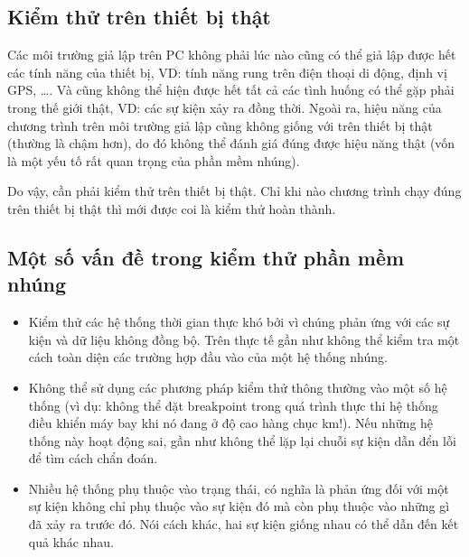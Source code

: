         \subsection{Kiểm thử trên thiết bị thật}
            Các môi trường giả lập trên PC không phải lúc nào cũng có thể giả lập được
            hết các tính năng của thiết bị, VD: tính năng rung trên điện thoại
            di động, định vị GPS, \ldots. Và cũng không thể hiện được hết tất
            cả các tình huống có thể gặp phải trong thế giới thật, VD: các sự
            kiện xảy ra đồng thời. Ngoài ra, hiệu năng của chương trình trên
            môi trường giả lập cũng không giống với trên thiết bị thật (thường
            là chậm hơn), do đó không thể đánh giá đúng được hiệu năng thật
            (vốn là một yếu tố rất quan trọng của phần mềm nhúng).

            Do vậy, cần phải kiểm thử trên thiết bị thật. Chỉ khi nào chương
            trình chạy đúng trên thiết bị thật thì mới được coi là kiểm thử hoàn thành.

        \subsection{Một số vấn đề trong kiểm thử phần mềm nhúng}
            \begin{itemize}
                \item Kiểm thử các hệ thống thời gian thực khó bởi vì chúng
                    phản ứng với các sự kiện và dữ liệu không đồng bộ. Trên
                    thực tế gần như không thể kiểm tra một cách toàn diện các
                    trường hợp đầu vào của một hệ thống nhúng.

                \item Không thể sử dụng các phương pháp kiểm thử thông thường
                    vào một số hệ thống (vì dụ: không thể đặt breakpoint trong
                    quá trình thực thi hệ thống điều khiển máy bay khi nó đang
                    ở độ cao hàng chục km!). Nếu những hệ thống này hoạt động
                    sai, gần như không thể lặp lại chuỗi sự kiện dẫn đển lỗi để
                    tìm cách chẩn đoán.

                \item Nhiều hệ thống phụ thuộc vào trạng thái, có nghĩa là phản
                    ứng đối với một sự kiện không chỉ phụ thuộc vào sự kiện đó
                    mà còn phụ thuộc vào những gì đã xảy ra trước đó. Nói cách
                    khác, hai sự kiện giống nhau có thể dẫn đến kết quả khác
                    nhau.
            \end{itemize}

